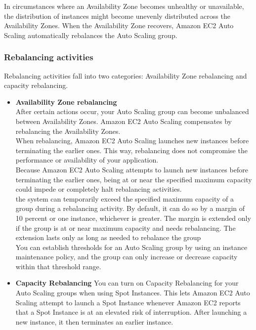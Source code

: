 \documentclass[12pt, letterpaper, twoside]{article}
\begin{document}
In circumstances where an Availability Zone becomes unhealthy or unavailable, the distribution of instances might 
become unevenly distributed across the Availability Zones. When the Availability Zone recovers, Amazon EC2 Auto 
Scaling automatically rebalances the Auto Scaling group.\\

\subsubsection{Rebalancing activities}
Rebalancing activities fall into two categories: Availability Zone rebalancing and capacity rebalancing.

\begin{itemize}
	\item \textbf{Availability Zone rebalancing}\\
	After certain actions occur, your Auto Scaling group can become unbalanced between Availability Zones. Amazon 
	EC2 Auto Scaling compensates by rebalancing the Availability Zones.\\

	When rebalancing, Amazon EC2 Auto Scaling launches new instances before terminating the earlier ones. 
	This way, rebalancing does not compromise the performance or availability of your application.\\

	Because Amazon EC2 Auto Scaling attempts to launch new instances before terminating the earlier ones, being 
	at or near the specified maximum capacity could impede or completely halt rebalancing activities.\\
	
	the system can temporarily exceed the specified maximum capacity of a group during a rebalancing activity. 
	By default, it can do so by a margin of 10 percent or one instance, whichever is greater. The margin is 
	extended only if the group is at or near maximum capacity and needs rebalancing. The extension lasts only as 
	long as needed to rebalance the group\\

	You can establish thresholds for an Auto Scaling group by using an instance maintenance policy, and the group 
	can only increase or decrease capacity within that threshold range.
	
	\item \textbf{Capacity Rebalancing}
	You can turn on Capacity Rebalancing for your Auto Scaling groups when using Spot Instances. This lets Amazon 
	EC2 Auto Scaling attempt to launch a Spot Instance whenever Amazon EC2 reports that a Spot Instance is at an 
	elevated risk of interruption. After launching a new instance, it then terminates an earlier instance.
\end{itemize}
\end{document}
